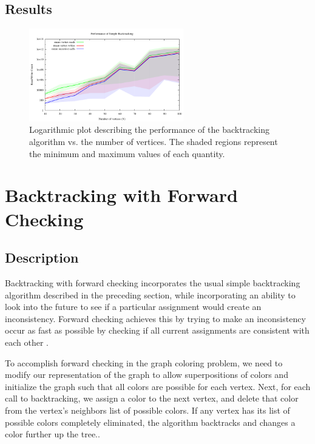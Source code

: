 \documentclass{article}
\begin{document}
	
	\subsection{Results}
		
		\begin{figure}[h!]
			\centering
			\includegraphics[width=0.6\textwidth]{../results_5/backtracking_simple/bt_simple_performance}
			\caption{Logarithmic plot describing the performance of the backtracking algorithm vs. the number of vertices. The shaded regions represent the minimum and maximum values of each quantity.}
		\end{figure}
	
\section{Backtracking with Forward Checking}

	\subsection{Description}
	
		Backtracking with forward checking incorporates the usual simple backtracking algorithm described in the preceding section, while incorporating an ability to look into the future to see if a particular assignment would create an inconsistency. Forward checking achieves this by trying to make an inconsistency occur as fast as possible by checking if all current assignments are consistent with each other \cite{haralick}.
		
		To accomplish forward checking in the graph coloring problem, we need to modify our representation of the graph to allow superpositions of colors and initialize the graph such that all colors are possible for each vertex. Next, for each call to backtracking, we assign a color to the next vertex, and delete that color from the vertex's neighbors list of possible colors. If any vertex has its list of possible colors completely eliminated, the algorithm backtracks and changes a color further up the tree.\cite{ai}.
		
\end{document}
